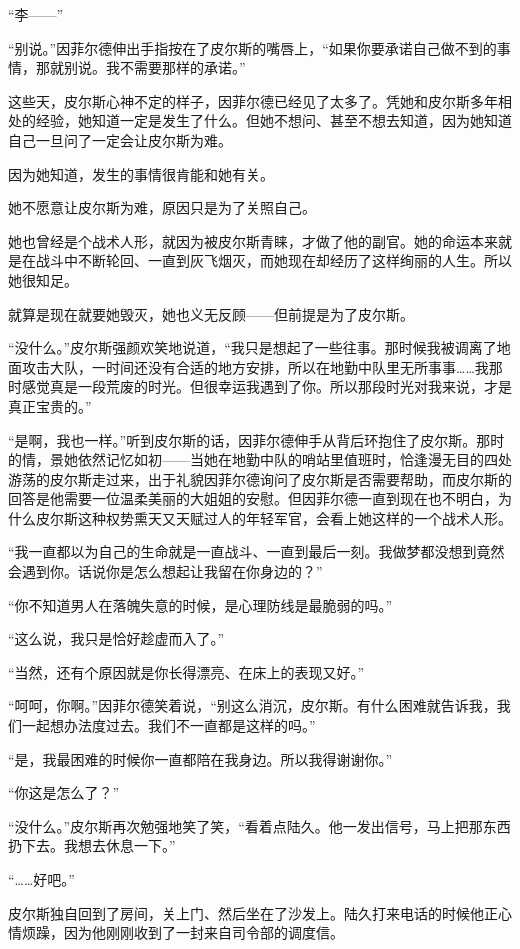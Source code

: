 “李——”

“别说。”因菲尔德伸出手指按在了皮尔斯的嘴唇上，“如果你要承诺自己做不到的事情，那就别说。我不需要那样的承诺。”

这些天，皮尔斯心神不定的样子，因菲尔德已经见了太多了。凭她和皮尔斯多年相处的经验，她知道一定是发生了什么。但她不想问、甚至不想去知道，因为她知道自己一旦问了一定会让皮尔斯为难。

因为她知道，发生的事情很肯能和她有关。

她不愿意让皮尔斯为难，原因只是为了关照自己。

她也曾经是个战术人形，就因为被皮尔斯青睐，才做了他的副官。她的命运本来就是在战斗中不断轮回、一直到灰飞烟灭，而她现在却经历了这样绚丽的人生。所以她很知足。

就算是现在就要她毁灭，她也义无反顾——但前提是为了皮尔斯。

“没什么。”皮尔斯强颜欢笑地说道，“我只是想起了一些往事。那时候我被调离了地面攻击大队，一时间还没有合适的地方安排，所以在地勤中队里无所事事……我那时感觉真是一段荒废的时光。但很幸运我遇到了你。所以那段时光对我来说，才是真正宝贵的。”

“是啊，我也一样。”听到皮尔斯的话，因菲尔德伸手从背后环抱住了皮尔斯。那时的情，景她依然记忆如初——当她在地勤中队的哨站里值班时，恰逢漫无目的四处游荡的皮尔斯走过来，出于礼貌因菲尔德询问了皮尔斯是否需要帮助，而皮尔斯的回答是他需要一位温柔美丽的大姐姐的安慰。但因菲尔德一直到现在也不明白，为什么皮尔斯这种权势熏天又天赋过人的年轻军官，会看上她这样的一个战术人形。

“我一直都以为自己的生命就是一直战斗、一直到最后一刻。我做梦都没想到竟然会遇到你。话说你是怎么想起让我留在你身边的？”

“你不知道男人在落魄失意的时候，是心理防线是最脆弱的吗。”

“这么说，我只是恰好趁虚而入了。”

“当然，还有个原因就是你长得漂亮、在床上的表现又好。”

“呵呵，你啊。”因菲尔德笑着说，“别这么消沉，皮尔斯。有什么困难就告诉我，我们一起想办法度过去。我们不一直都是这样的吗。”

“是，我最困难的时候你一直都陪在我身边。所以我得谢谢你。”

“你这是怎么了？”

“没什么。”皮尔斯再次勉强地笑了笑，“看着点陆久。他一发出信号，马上把那东西扔下去。我想去休息一下。”

“……好吧。”

皮尔斯独自回到了房间，关上门、然后坐在了沙发上。陆久打来电话的时候他正心情烦躁，因为他刚刚收到了一封来自司令部的调度信。

